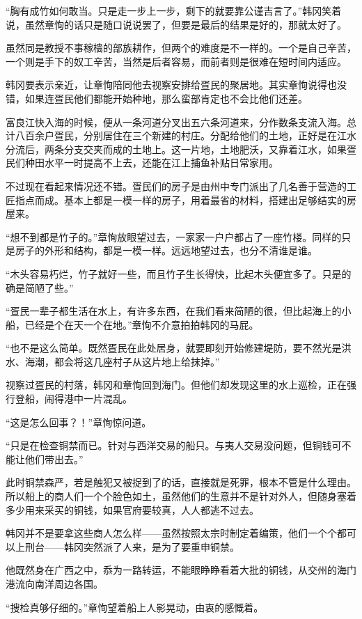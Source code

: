 “胸有成竹如何敢当。只是走一步上一步，剩下的就要靠公谨吉言了。”韩冈笑着说，虽然章恂的话只是随口说说罢了，但要是最后的结果是好的，那就太好了。

虽然同是教授不事稼樯的部族耕作，但两个的难度是不一样的。一个是自己辛苦，一个则是手下的奴工辛苦，当然是后者容易，而前者则是很难在短时间内适应。

韩冈要表示亲近，让章恂陪同他去视察安排给疍民的聚居地。其实章恂说得也没错，如果连疍民他们都能开始种地，那么蛮部肯定也不会比他们还差。

富良江快入海的时候，便从一条河道分叉出五六条河道来，分作数条支流入海。总计八百余户疍民，分别居住在三个新建的村庄。分配给他们的土地，正好是在江水分流后，两条分支交夹而成的土地上。这一片地，土地肥沃，又靠着江水，如果疍民们种田水平一时提高不上去，还能在江上捕鱼补贴日常家用。

不过现在看起来情况还不错。疍民们的房子是由州中专门派出了几名善于营造的工匠指点而成。基本上都是一模一样的房子，用着最省的材料，搭建出足够结实的房屋来。

“想不到都是竹子的。”章恂放眼望过去，一家家一户户都占了一座竹楼。同样的只是房子的外形和结构，都是一模一样。远远地望过去，也分不清谁是谁。

“木头容易朽烂，竹子就好一些，而且竹子生长得快，比起木头便宜多了。只是的确是简陋了些。”

“疍民一辈子都生活在水上，有许多东西，在我们看来简陋的很，但比起海上的小船，已经是个在天一个在地。”章恂不介意拍拍韩冈的马屁。

“也不是这么简单。既然疍民在此处居身，就要即刻开始修建堤防，要不然光是洪水、海潮，都会将这几座村子从这片地上给抹掉。”

视察过疍民的村落，韩冈和章恂回到海门。但他们却发现这里的水上巡检，正在强行登船，闹得港中一片混乱。

“这是怎么回事？！”章恂惊问道。

“只是在检查铜禁而已。针对与西洋交易的船只。与夷人交易没问题，但铜钱可不能让他们带出去。”

此时铜禁森严，若是触犯又被捉到了的话，直接就是死罪，根本不管是什么理由。所以船上的商人们一个个脸色如土，虽然他们的生意并不是针对外人，但随身塞着多少用来采买的铜钱，如果官府要较真，人人都逃不过去。

韩冈并不是要拿这些商人怎么样——虽然按照太宗时制定着编策，他们一个个都可以上刑台——韩冈突然派了人来，是为了要重申铜禁。

他既然身在广西之中，忝为一路转运，不能眼睁睁看着大批的铜钱，从交州的海门港流向南洋周边各国。

“搜检真够仔细的。”章恂望着船上人影晃动，由衷的感慨着。

